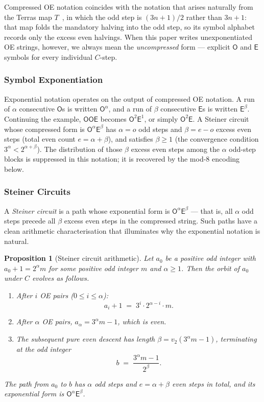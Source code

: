 \documentclass[11pt,a4paper]{article}
\newtheorem{proposition}[theorem]{Proposition}
\theoremstyle{remark}
\theoremstyle{plain}
\begin{document}
Compressed OE notation coincides with the notation that arises naturally from the
Terras map $T$~\cite{terras1976}, in which the odd step is $(3n+1)/2$ rather than
$3n+1$: that map folds the mandatory halving into the odd step, so its symbol
alphabet records only the excess even halvings.
When this paper writes unexponentiated OE strings, however, we always mean the
\emph{uncompressed} form — explicit $\mathsf{O}$ and $\mathsf{E}$ symbols for
every individual $C$-step.

\subsubsection{Symbol Exponentiation}

Exponential notation operates on the output of compressed OE notation.
A run of $\alpha$ consecutive $\mathsf{O}$s is written $\mathsf{O}^\alpha$,
and a run of $\beta$ consecutive $\mathsf{E}$s is written $\mathsf{E}^\beta$.
Continuing the example, $\mathsf{OOE}$ becomes $\mathsf{O}^2\mathsf{E}^1$,
or simply $\mathsf{O}^2\mathsf{E}$.
A Steiner circuit whose compressed form is $\mathsf{O}^\alpha\mathsf{E}^\beta$
has $\alpha = o$ odd steps and $\beta = e - o$ excess even steps
(total even count $e = \alpha + \beta$), and satisfies $\beta \geq 1$
(the convergence condition $3^\alpha < 2^{\alpha+\beta}$).
The distribution of those $\beta$ excess even steps among the $\alpha$ odd-step
blocks is suppressed in this notation; it is recovered by the mod-8 encoding below.

\subsubsection{Steiner Circuits}
\label{sec:steiner-circuits}

A \emph{Steiner circuit} is a path whose exponential form is
$\mathsf{O}^\alpha\mathsf{E}^\beta$ — that is, all $\alpha$ odd steps precede all
$\beta$ excess even steps in the compressed string.
Such paths have a clean arithmetic characterisation that illuminates why the
exponential notation is natural.

\begin{proposition}[Steiner circuit arithmetic]\label{prop:steiner}
Let $a_0$ be a positive odd integer with $a_0 + 1 = 2^\alpha m$ for some
positive odd integer $m$ and $\alpha \geq 1$.
Then the orbit of $a_0$ under $C$ evolves as follows.
\begin{enumerate}
  \item After $i$ OE pairs ($0 \leq i \leq \alpha$):
    \[
      a_i + 1 \;=\; 3^i \cdot 2^{\alpha - i} \cdot m.
    \]
  \item After $\alpha$ OE pairs, $a_\alpha = 3^\alpha m - 1$, which is even.
  \item The subsequent pure even descent has length $\beta = v_2(3^\alpha m - 1)$,
    terminating at the odd integer
    \[
      b \;=\; \frac{3^\alpha m - 1}{2^\beta}.
    \]
\end{enumerate}
The path from $a_0$ to $b$ has $\alpha$ odd steps and $e = \alpha + \beta$ even
steps in total, and its exponential form is $\mathsf{O}^\alpha\mathsf{E}^\beta$.
\end{proposition}
\end{document}
